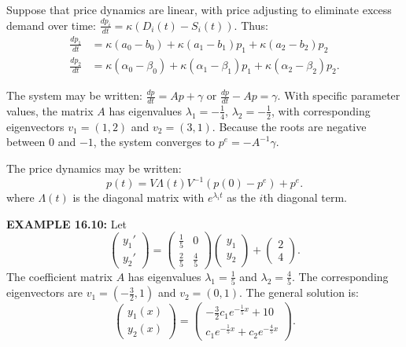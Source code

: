 \begin{original}
Suppose that price dynamics are linear, with price adjusting to eliminate excess demand over time: $\frac{d p_i}{dt} = \kappa(D_i(t) - S_i(t))$. Thus:
\begin{align*}
\frac{d p_1}{dt} &= \kappa(a_0 - b_0) + \kappa(a_1 - b_1)p_1 + \kappa(a_2 - b_2)p_2\\
\frac{d p_2}{dt} &= \kappa(\alpha_0 - \beta_0) + \kappa(\alpha_1 - \beta_1)p_1 + \kappa(\alpha_2 - \beta_2)p_2.
\end{align*}

The system may be written: $\frac{dp}{dt} = Ap + \gamma$ or $\frac{dp}{dt} - Ap = \gamma$. With specific parameter values, the matrix $A$ has eigenvalues $\lambda_1 = -\frac{1}{4}$, $\lambda_2 = -\frac{1}{2}$, with corresponding eigenvectors $v_1 = (1, 2)$ and $v_2 = (3, 1)$. Because the roots are negative between $0$ and $-1$, the system converges to $p^e = -A^{-1}\gamma$.

The price dynamics may be written:
\[
p(t) = V \Lambda(t) V^{-1}(p(0) - p^e) + p^e.
\]
where $\Lambda(t)$ is the diagonal matrix with $e^{\lambda_i t}$ as the $i$th diagonal term.

\textbf{EXAMPLE 16.10:} Let
\[
\begin{pmatrix} y_1' \\ y_2' \end{pmatrix} = \begin{pmatrix} \frac{1}{5} & 0 \\ \frac{2}{5} & \frac{4}{5} \end{pmatrix} \begin{pmatrix} y_1 \\ y_2 \end{pmatrix} + \begin{pmatrix} 2 \\ 4 \end{pmatrix}.
\]
The coefficient matrix $A$ has eigenvalues $\lambda_1 = \frac{1}{5}$ and $\lambda_2 = \frac{4}{5}$. The corresponding eigenvectors are $v_1 = (-\frac{3}{2}, 1)$ and $v_2 = (0, 1)$. The general solution is:
\[
\begin{pmatrix} y_1(x) \\ y_2(x) \end{pmatrix} = \begin{pmatrix} -\frac{3}{2} c_1 e^{-\frac{1}{5}x} + 10 \\ c_1 e^{-\frac{1}{5}x} + c_2 e^{-\frac{4}{5}x} \end{pmatrix}.
\]
\end{original}
